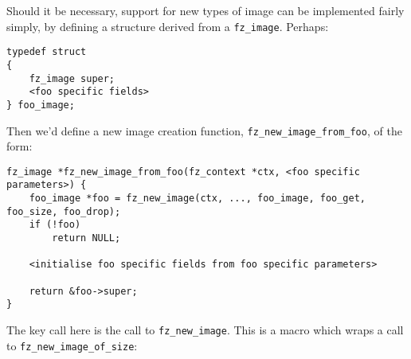 \documentclass[oneside]{book}
\begin{document}
Should it be necessary, support for new types of image can be implemented fairly simply, by defining a structure derived from a \texttt{fz\_image}. Perhaps:

\begin{lstlisting}
typedef struct
{
	fz_image super;
	<foo specific fields>
} foo_image;
\end{lstlisting}

Then we'd define a new image creation function, \texttt{fz\_new\_image\_from\_foo}, of the form:

\begin{lstlisting}
fz_image *fz_new_image_from_foo(fz_context *ctx, <foo specific parameters>) {
	foo_image *foo = fz_new_image(ctx, ..., foo_image, foo_get, foo_size, foo_drop);
	if (!foo)
		return NULL;

	<initialise foo specific fields from foo specific parameters>
	
	return &foo->super;
}
\end{lstlisting}

The key call here is the call to \texttt{fz\_new\_image}. This is a macro which wraps a call to \texttt{fz\_new\_image\_of\_size}:
\end{document}
